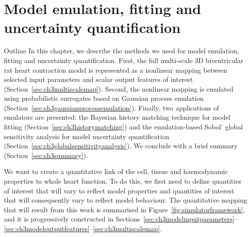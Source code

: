 \chapter{Model emulation, fitting and uncertainty 
quantification}\label{cha:chapter3}
%
%
%
\begin{remark}{Outline}
    In this chapter, we describe the methods we used for model emulation, fitting and uncertainty quantification. First, the full multi-scale $3$D biventricular rat heart contraction model is represented as a nonlinear mapping between selected input parameters and scalar output features of interest (Section~\ref{sec:ch3multiscalemap}). Second, the nonlinear mapping is emulated using probabilistic surrogates based on Gaussian process emulation (Section~\ref{sec:ch3gaussianprocessemulation}). Finally, two applications of emulators are presented: the Bayesian history matching technique for model fitting (Section~\ref{sec:ch3historymatching}) and the emulation-based Sobol' global sensitivity analysis for model uncertainty quantification (Section~\ref{sec:ch3globalsensitivityanalysis}). We conclude with a brief summary (Section~\ref{sec:ch3summary}).
\end{remark}

We want to create a quantitative link of the cell, tissue and haemodynamic properties to whole heart function. To do this, we first need to define quantities of interest that will vary to reflect model properties and quantities of interest that will consequently vary to reflect model behaviour. The quantitative mapping that will result from this work is summarised in Figure~\ref{fig:simulatorframework}, and it is progressively constructed in Sections~\ref{sec:ch3modelinputparameters}--\ref{sec:ch3modeloutputfeatures}--\ref{sec:ch3multiscalemap}.

